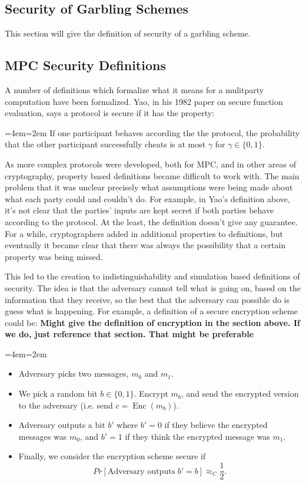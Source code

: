 \documentclass[12pt,twoside]{reedthesis}
\newcommand{\Enc}{\operatorname{Enc}}
\newenvironment{blockquote}{%
  \par%
  \medskip
  \leftskip=4em\rightskip=2em%
  \noindent\ignorespaces}{%
  \par\medskip}
\begin{document}
\subsection{Security of Garbling Schemes}
This section will give the definition of security of a garbling scheme.

\subsection{MPC Security Definitions}
A number of definitions which formalize what it means for a mulitparty computation have been formalized. 
Yao, in his 1982 paper on secure function evaluation, says a protocol is secure if it has the property:

\begin{blockquote}
If one participant behaves according the the protocol, the probability that the other participant successfully cheats is at most $\gamma$ for $\gamma \in \{0,1\}$.
\end{blockquote}
As more complex protocols were developed, both for MPC, and in other areas of cryptography, property based definitions became difficult to work with.
The main problem that it was unclear precisely what assumptions were being made about what each party could and couldn't do. 
For example, in Yao's definition above, it's not clear that the parties' inputs are kept secret if both parties behave according to the protocol.
At the least, the definition doesn't give any guarantee.
For a while, cryptographers added in additional properties to definitions, but eventually it became clear that there was always the possibility that a certain property was being missed.

This led to the creation to indistinguishability and simulation based definitions of security.
The idea is that the adversary cannot tell what is going on, based on the information that they receive, so the best that the adversary can possible do is guess what is happening.
For example, a definition of a secure encryption scheme could be:
\textbf{Might give the definition of encryption in the section above. If we do, just reference that section. That might be preferable}
\begin{blockquote}
\begin{itemize}
	\item Adversary picks two messages, $m_0$ and $m_1$. 
	\item We pick a random bit $b \in \{0,1\}$. Encrypt $m_b$, and send the encrypted version to the adversary (i.e. send $c = \Enc(m_b)$).
	\item Adversary outputs a bit $b'$ where $b' = 0$ if they believe the encrypted messages was $m_0$, and $b' = 1$ if they think the encrypted message was $m_1$. 
	\item Finally, we consider the encryption scheme secure if
	$$Pr[\text{Adversary outputs $b' = b$}] \approx_C \frac{1}{2}.$$
\end{itemize}
\end{blockquote}
\end{document}
